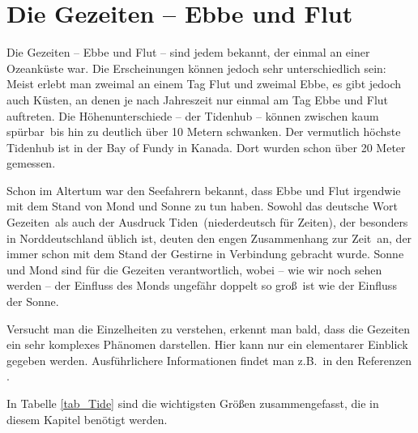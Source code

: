 

\chapter{Die Gezeiten -- Ebbe und Flut}
\label{chap_Gezeiten}

%
Die Gezeiten -- Ebbe und Flut -- sind jedem bekannt, der einmal an einer Ozeank\"uste
war. Die Erscheinungen k\"onnen jedoch sehr unterschiedlich sein: Meist erlebt man
zweimal an einem Tag Flut und zweimal Ebbe, es gibt jedoch auch K\"usten, an denen
je nach Jahreszeit nur einmal am Tag Ebbe und Flut auftreten. Die H\"ohenunterschiede
-- der Tidenhub -- 
k\"onnen zwischen \glqq kaum sp\"urbar\grqq\ bis hin zu deutlich \"uber 10 Metern schwanken.  
Der vermutlich h\"ochste Tidenhub ist in der Bay of Fundy in Kanada. 
Dort wurden schon \"uber 20 Meter gemessen. 

Schon im Altertum war den Seefahrern bekannt, dass Ebbe und Flut irgendwie mit
dem Stand von Mond und Sonne zu tun haben. Sowohl das deutsche Wort \glqq Gezeiten\grqq\
als auch der Ausdruck \glqq Tiden\grqq\ (niederdeutsch f\"ur \glqq Zeiten\grqq), 
der besonders in Norddeutschland \"ublich ist,
deuten den engen Zusammenhang zur \glqq Zeit\grqq\ an, der immer schon mit dem Stand
der Gestirne in Verbindung gebracht wurde. Sonne und Mond sind f\"ur die Gezeiten 
verantwortlich, wobei -- wie wir noch sehen werden -- der Einfluss des Monds ungef\"ahr 
doppelt so gro\ss\ ist wie der Einfluss der Sonne.

Versucht man die Einzelheiten zu verstehen, erkennt man bald, dass die Gezeiten ein
sehr komplexes Ph\"anomen darstellen. Hier kann nur ein elementarer Einblick gegeben werden.
Ausf\"uhrlichere Informationen findet man z.B.\ in den Referenzen \cite{Hicks,Kowalik,Parker}.

In Tabelle \ref{tab_Tide} sind die wichtigsten Gr\"o\ss en zusammengefasst, die in diesem
Kapitel ben\"otigt werden.


